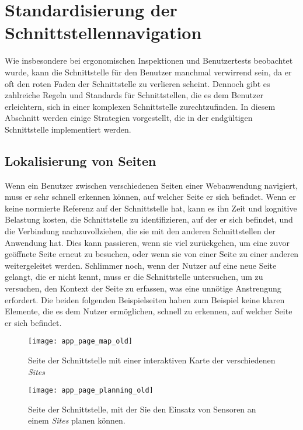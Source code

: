 \section{Standardisierung der Schnittstellennavigation}

Wie insbesondere bei ergonomischen Inspektionen und Benutzertests beobachtet wurde, kann die Schnittstelle für den Benutzer manchmal verwirrend sein, da er oft den roten Faden der Schnittstelle zu verlieren scheint.
Dennoch gibt es zahlreiche Regeln und Standards für Schnittstellen, die es dem Benutzer erleichtern, sich in einer komplexen Schnittstelle zurechtzufinden.
In diesem Abschnitt werden einige Strategien vorgestellt, die in der endgültigen Schnittstelle implementiert werden.

\subsection{Lokalisierung von Seiten}

Wenn ein Benutzer zwischen verschiedenen Seiten einer Webanwendung navigiert, muss er sehr schnell erkennen können, auf welcher Seite er sich befindet.
Wenn er keine normierte Referenz auf der Schnittstelle hat, kann es ihn Zeit und kognitive Belastung kosten, die Schnittstelle zu identifizieren, auf der er sich befindet, und die Verbindung nachzuvollziehen, die sie mit den anderen Schnittstellen der Anwendung hat.
Dies kann passieren, wenn sie viel zurückgehen, um eine zuvor geöffnete Seite erneut zu besuchen, oder wenn sie von einer Seite zu einer anderen weitergeleitet werden.
Schlimmer noch, wenn der Nutzer auf eine neue Seite gelangt, die er nicht kennt, muss er die Schnittstelle untersuchen, um zu versuchen, den Kontext der Seite zu erfassen, was eine unnötige Anstrengung erfordert.
Die beiden folgenden Beispielseiten haben zum Beispiel keine klaren Elemente, die es dem Nutzer ermöglichen, schnell zu erkennen, auf welcher Seite er sich befindet.

\begin{figure}[H]
  \centering
  \texttt{[image: app\_page\_map\_old]}
  \caption{Seite der Schnittstelle mit einer interaktiven Karte der verschiedenen \textit{Sites}}
  \label{fig:app_page_map_old}
\end{figure}
\begin{figure}[H]
  \centering
  \texttt{[image: app\_page\_planning\_old]}
  \caption{Seite der Schnittstelle, mit der Sie den Einsatz von Sensoren an einem \textit{Sites} planen können.}
  \label{fig:app_page_planning_old}
\end{figure}

